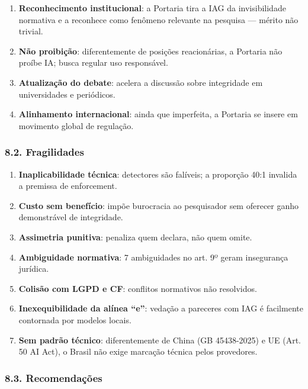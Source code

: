 \documentclass[
  12pt,
  a4paper,
  brazil
]{article}
\begin{document}
\begin{enumerate}
\def\labelenumi{\arabic{enumi}.}
\tightlist
\item
  \textbf{Reconhecimento institucional}: a Portaria tira a IAG da
  invisibilidade normativa e a reconhece como fenômeno relevante na
  pesquisa --- mérito não trivial.
\item
  \textbf{Não proibição}: diferentemente de posições reacionárias, a
  Portaria não proíbe IA; busca regular uso responsável.
\item
  \textbf{Atualização do debate}: acelera a discussão sobre integridade
  em universidades e periódicos.
\item
  \textbf{Alinhamento internacional}: ainda que imperfeita, a Portaria
  se insere em movimento global de regulação.
\end{enumerate}

\subsubsection{8.2. Fragilidades}\label{fragilidades}

\begin{enumerate}
\def\labelenumi{\arabic{enumi}.}
\tightlist
\item
  \textbf{Inaplicabilidade técnica}: detectores são falíveis; a
  proporção 40:1 invalida a premissa de enforcement.
\item
  \textbf{Custo sem benefício}: impõe burocracia ao pesquisador sem
  oferecer ganho demonstrável de integridade.
\item
  \textbf{Assimetria punitiva}: penaliza quem declara, não quem omite.
\item
  \textbf{Ambiguidade normativa}: 7 ambiguidades no art. 9º geram
  insegurança jurídica.
\item
  \textbf{Colisão com LGPD e CF}: conflitos normativos não resolvidos.
\item
  \textbf{Inexequibilidade da alínea ``e''}: vedação a pareceres com IAG
  é facilmente contornada por modelos locais.
\item
  \textbf{Sem padrão técnico}: diferentemente de China (GB 45438-2025) e
  UE (Art. 50 AI Act), o Brasil não exige marcação técnica pelos
  provedores.
\end{enumerate}

\subsubsection{8.3. Recomendações}\label{recomendauxe7uxf5es}
\end{document}
